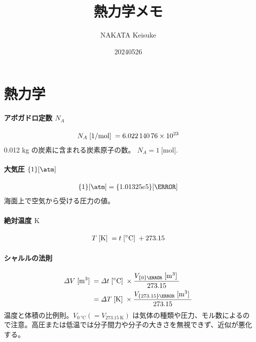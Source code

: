 \documentclass[a4paper,11pt]{jsarticle}
\newcommand{\braunit}[1]{\;\text{[}\unit[per-mode = symbol]{#1}\text{]}\;}
\begin{document}
\title{熱力学メモ}
\author{NAKATA Keisuke}
\date{20240526}
\maketitle


\part*{熱力学}

\subsection*{アボガドロ定数 $N_A$}
\begin{align*}
  N_A \braunit{\per\mol}= \num{6.02214076e23}
\end{align*}
0.012 kg の炭素に含まれる炭素原子の数。 $N_A = \qty{1}{[\mol]}$.
\cite[pp.1]{thermo}

\subsection*{大気圧 $\qty{1}{[\atm]}$}
\begin{align*}
  \qty{1}{[\atm]} = \qty{1.01325e5}{[\Pa]}
\end{align*}
海面上で空気から受ける圧力の値。
\cite[pp.1]{thermo}

\subsection*{絶対温度 $\unit{\K}$}
\begin{align*}
  T \braunit{\K} = t \braunit{\celsius} + 273.15
\end{align*}
\cite[pp.10]{thermo}

\subsection*{シャルルの法則}
\begin{align*}
  \varDelta V\braunit{\m^3}
    &= \varDelta t\braunit{\celsius}\times\frac{V_{\qty{0}{\celsius}}\braunit{\m^3}}{273.15} \\
    &= \varDelta T\braunit{\K}\times\frac{V_{\qty{273.15}{\K}}\braunit{\m^3}}{273.15}
\end{align*}
温度と体積の比例則。$V_{\qty{0}{\celsius}} (=V_{\qty{273.15}{\K}})$ は気体の種類や圧力、モル数によるので注意。高圧または低温では分子間力や分子の大きさを無視できず、近似が悪化する。
\cite[pp.10]{thermo}
\end{document}
